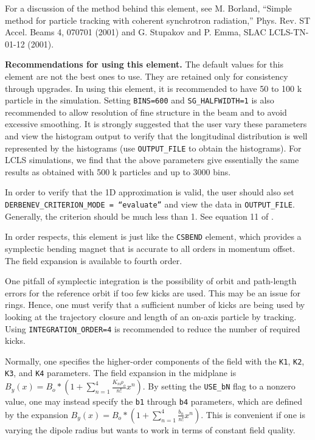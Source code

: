 For a discussion of the method behind this element, see M. Borland,
``Simple method for particle tracking with coherent synchrotron
radiation,'' Phys. Rev. ST Accel. Beams 4, 070701 (2001) and
G. Stupakov and P. Emma, SLAC LCLS-TN-01-12 (2001).

{\bf Recommendations for using this element.}  The default values for
this element are not the best ones to use.  They are retained only for
consistency through upgrades.  In using this element, it is
recommended to have 50 to 100 k particle in the simulation.  Setting
{\tt BINS=600} and {\tt SG\_HALFWIDTH=1} is also recommended to allow
resolution of fine structure in the beam and to avoid excessive
smoothing.  It is strongly suggested that the user vary these
parameters and view the histogram output to verify that the
longitudinal distribution is well represented by the histograms (use
{\tt OUTPUT\_FILE} to obtain the histograms).  For LCLS simulations,
we find that the above parameters give essentially the same results as
obtained with 500 k particles and up to 3000 bins.

In order to verify that the 1D approximation is valid, the user should
also set {\tt DERBENEV\_CRITERION\_MODE = ``evaluate''} and view
the data in {\tt OUTPUT\_FILE}.  Generally, the criterion should be
much less than 1.  See equation 11 of \cite{Derbenev}.

In order respects, this element is just like the {\tt CSBEND} element,
which provides a symplectic bending magnet that is accurate to all
orders in momentum offset.  The field expansion is available to fourth
order.

One pitfall of symplectic integration is the possibility of orbit and
path-length errors for the reference orbit if too few kicks are used.
This may be an issue for rings.  Hence, one must verify that a
sufficient number of kicks are being used by looking at the trajectory
closure and length of an on-axis particle by tracking.  Using 
{\tt INTEGRATION\_ORDER=4} is recommended to reduce the number of
required kicks.

Normally, one specifies the higher-order components of the field with
the {\tt K1}, {\tt K2}, {\tt K3}, and {\tt K4} parameters. The field
expansion in the midplane is $B_y(x) = B_o * (1 +
\sum_{n=1}^4\frac{K_n\rho_o}{n!}x^n)$.  By setting the {\tt USE\_bN}
flag to a nonzero value, one may instead specify the {\tt b1} through
{\tt b4} parameters, which are defined by the expansion $B_y(x) = B_o
* (1 + \sum_{n=1}^4\frac{b_n}{n!}x^n)$.  This is convenient if one is
varying the dipole radius but wants to work in terms of constant field
quality.  

